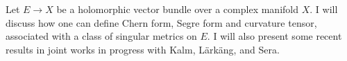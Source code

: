 {%
    Let $E\to X$ be a holomorphic vector bundle over a complex
    manifold $X$. I will discuss how one can define Chern form,
    Segre form and curvature tensor, associated with a class of
    singular metrics on $E$. I will also present some recent results
    in joint works in progress with Kalm, Lärkäng, and Sera.
}

